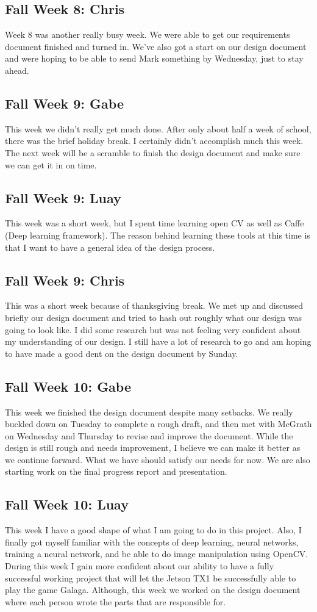 \documentclass[onecolumn, draftclsnofoot,10pt, compsoc]{IEEEtran}
\begin{document}
\subsection{Fall Week 8: Chris}
Week 8 was another really busy week. We were able to get our requirements document finished and turned in. We've also got a start on our design document and were hoping to be able to send Mark something by Wednesday, just to stay ahead.
\subsection{Fall Week 9: Gabe}
This week we didn't really get much done. After only about half a week of school, there was the brief holiday break. I certainly didn't accomplish much this week. The next week will be a scramble to finish the design document and make sure we can get it in on time.
\subsection{Fall Week 9: Luay}
This week was a short week, but I spent time learning open CV as well as Caffe (Deep learning framework). The reason behind learning these tools at this time is that I want to have a general idea of the design process.
\subsection{Fall Week 9: Chris}
This was a short week because of thanksgiving break. We met up and discussed briefly our design document and tried to hash out roughly what our design was going to look like. I did some research but was not feeling very confident about my understanding of our design. I still have a lot of research to go and am hoping to have made a good dent on the design document by Sunday.
\subsection{Fall Week 10: Gabe}
This week we finished the design document despite many setbacks. We really buckled down on Tuesday to complete a rough draft, and then met with McGrath on Wednesday and Thursday to revise and improve the document. While the design is still rough and needs improvement, I believe we can make it better as we continue forward. What we have should satisfy our needs for now. We are also starting work on the final progress report and presentation.
\subsection{Fall Week 10: Luay}
This week I have a good shape of what I am going to do in this project. Also, I finally got myself familiar with the concepts of deep learning, neural networks, training a neural network, and be able to do image manipulation using OpenCV. During this week I gain more confident about our ability to have a fully successful working project that will let the Jetson TX1 be successfully able to play the game Galaga. Although, this week we worked on the design document where each person wrote the parts that are responsible for.
\end{document}
